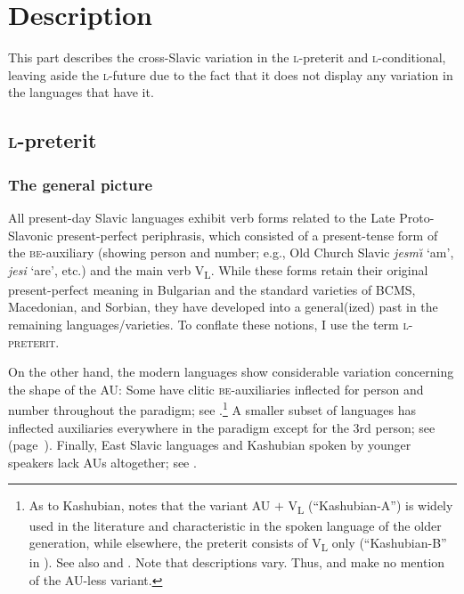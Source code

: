 \documentclass[output=paper]{langscibook}
\begin{document}

\section{Description}\label{pitsch:sec:description}

This part describes the cross-Slavic variation in the \textsc{l-}preterit and \textsc{l-}conditional, leaving aside the \textsc{l-}future due to the fact that it does not display any variation in the languages that have it.


\subsection{\textsc{l-}preterit}\label{pitsch:sec:perfect}

\subsubsection{The general picture}

All present-day Slavic languages exhibit verb forms related to the Late Proto-Slavonic present-perfect periphrasis, which consisted of a present-tense form of the \textsc{be}-auxiliary (showing person and number; e.g., Old Church Slavic \textit{jesm\u{\i}} `am', \textit{jesi} `are', etc.) and the main verb V\textsubscript{L}. While these forms retain their original present-perfect meaning in Bulgarian and the standard varieties of BCMS, Macedonian, and Sorbian, they have developed into a general(ized) past in the remaining languages/varieties. To conflate these notions, I use the term \textsc{l-preterit}.

On the other hand, the modern languages show considerable variation concerning the shape of the AU: Some have clitic \textsc{be}-auxiliaries inflected for person and number throughout the paradigm; see .\footnote{As to Kashubian, \citet[776]{Stone1993} notes that the variant AU $+$ V\textsubscript{L} (``Kashubian-A'') is widely used in the literature and characteristic in the spoken language of the older generation, while elsewhere, the preterit consists of V\textsubscript{L} only (``Kashubian-B'' in ). See also \citet{Menzel2013} and \citet{Bartelik2015}. Note that descriptions vary. Thus, \citet[268]{Lubas2002} and \citet[174]{Breza2009} make no mention of the AU-less variant.} A smaller subset of languages has inflected auxiliaries everywhere in the paradigm except for the 3rd person; see  (page~\pageref{pitsch:tab:perfect_3rd}). Finally, East Slavic languages and Kashubian spoken by younger speakers lack AUs altogether; see .
\end{document}
